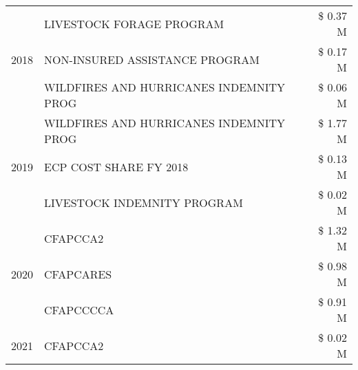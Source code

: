 \begin{tabular}{llr}
\cline{1-3}
\multirow[t]{3}{*}{2018} & LIVESTOCK FORAGE PROGRAM & \$ 0.37 M \\
 & NON-INSURED ASSISTANCE PROGRAM & \$ 0.17 M \\
 & WILDFIRES AND HURRICANES INDEMNITY PROG & \$ 0.06 M \\
\cline{1-3}
\multirow[t]{3}{*}{2019} & WILDFIRES AND HURRICANES INDEMNITY PROG & \$ 1.77 M \\
 & ECP COST SHARE FY 2018 & \$ 0.13 M \\
 & LIVESTOCK INDEMNITY PROGRAM & \$ 0.02 M \\
\cline{1-3}
\multirow[t]{3}{*}{2020} & CFAPCCA2 & \$ 1.32 M \\
 & CFAPCARES & \$ 0.98 M \\
 & CFAPCCCCA & \$ 0.91 M \\
\cline{1-3}
2021 & CFAPCCA2 & \$ 0.02 M \\
\cline{1-3}
\bottomrule
\end{tabular}
